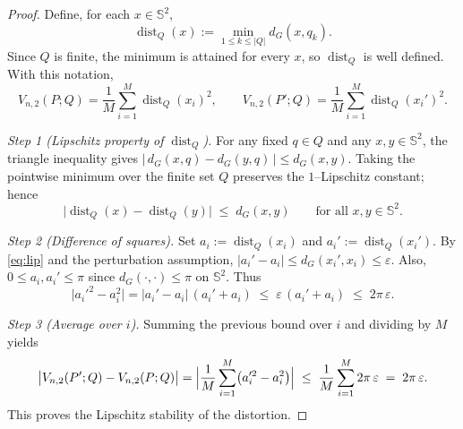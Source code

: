 \documentclass[12pt, reqno]{amsart}
\theoremstyle{plain}
\theoremstyle{definition}
\begin{document}
\begin{proof}
Define, for each $x\in\mathbb{S}^2$,
\[
\operatorname{dist}_Q(x):=\min_{1\le k\le |Q|} d_G(x,q_k).
\]
Since $Q$ is finite, the minimum is attained for every $x$, so $\operatorname{dist}_Q$ is well defined.
With this notation,
\[
V_{n,2}(P;Q)=\frac1M\sum_{i=1}^M \operatorname{dist}_Q(x_i)^2,
\qquad
V_{n,2}(P';Q)=\frac1M\sum_{i=1}^M \operatorname{dist}_Q(x_i')^2.
\]

\smallskip
\noindent\textit{Step 1 (Lipschitz property of $\operatorname{dist}_Q$).}
For any fixed $q\in Q$ and any $x,y\in\mathbb{S}^2$, the triangle inequality gives
$|\,d_G(x,q)-d_G(y,q)\,| \le d_G(x,y)$.
Taking the pointwise minimum over the finite set $Q$ preserves the $1$–Lipschitz constant; hence
\begin{equation}\label{eq:lip}
\bigl|\operatorname{dist}_Q(x)-\operatorname{dist}_Q(y)\bigr|
\;\le\; d_G(x,y) \qquad \text{for all }x,y\in\mathbb{S}^2.
\end{equation}

\smallskip
\noindent\textit{Step 2 (Difference of squares).}
Set $a_i:=\operatorname{dist}_Q(x_i)$ and $a_i':=\operatorname{dist}_Q(x_i')$.
By \eqref{eq:lip} and the perturbation assumption, $|a_i'-a_i|\le d_G(x_i',x_i)\le \varepsilon$.
Also, $0\le a_i,a_i'\le \pi$ since $d_G(\cdot,\cdot)\le \pi$ on $\mathbb{S}^2$.
Thus
\[
\bigl|a_i'^2-a_i^2\bigr|
=|a_i'-a_i|\,(a_i'+a_i)
\;\le\; \varepsilon\,(a_i'+a_i)
\;\le\; 2\pi\,\varepsilon.
\]

\smallskip
\noindent\textit{Step 3 (Average over $i$).}
Summing the previous bound over $i$ and dividing by $M$ yields
\[
\bigl|V_{n,2}(P';Q)-V_{n,2}(P;Q)\bigr|
=\Bigl|\frac1M\sum_{i=1}^M\bigl(a_i'^2-a_i^2\bigr)\Bigr|
\;\le\;\frac1M\sum_{i=1}^M 2\pi\,\varepsilon
\;=\; 2\pi\,\varepsilon.
\]
This proves the Lipschitz stability of the distortion.
\end{proof}
\end{document}

